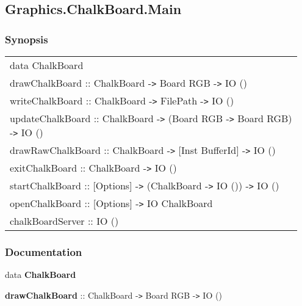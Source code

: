 \subsection{Graphics.ChalkBoard.Main}     

  

 

 

\subsubsection{Synopsis}

 

 
\begin{tabular}{p{0.95\linewidth}}{data  ChalkBoard }\\ %


{drawChalkBoard :: ChalkBoard -{\tt >} Board RGB -{\tt >} IO ()}\\ %


{writeChalkBoard :: ChalkBoard -{\tt >} FilePath -{\tt >} IO ()}\\ %


{updateChalkBoard :: ChalkBoard -{\tt >} (Board RGB -{\tt >} Board RGB) -{\tt >} IO ()}\\ %


{drawRawChalkBoard :: ChalkBoard -{\tt >} [Inst BufferId] -{\tt >} IO ()}\\ %


{exitChalkBoard :: ChalkBoard -{\tt >} IO ()}\\ %


{startChalkBoard :: [Options] -{\tt >} (ChalkBoard -{\tt >} IO ()) -{\tt >} IO ()}\\ %


{openChalkBoard :: [Options] -{\tt >} IO ChalkBoard}\\ %


{chalkBoardServer :: IO ()}\\ %


\end{tabular}


 

\subsubsection{Documentation}

 

{data  {\bf ChalkBoard}  }

 

{{\bf drawChalkBoard} :: ChalkBoard -{\tt >} Board RGB -{\tt >} IO ()}

